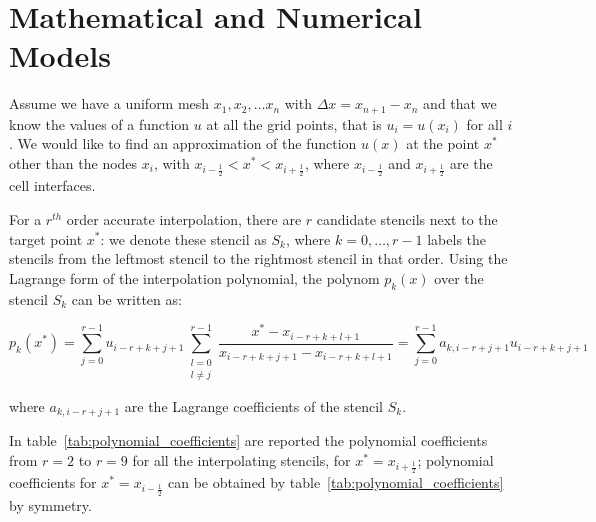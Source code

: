 \section{Mathematical and Numerical Models}\label{sec:MNmodels}

Assume we have a uniform mesh $x_1, x_2, \dots x_n$ with $\Delta x = x_{n+1} - x_n$ and that we know the values of a function $u$ at all the grid points, that is $u_i = u(x_i)$ for all $i$. We would like to find an approximation of the function $u(x)$ at the point $x^*$ other than the nodes $x_i$, with $x_{i-\frac{1}{2}} < x^* < x_{i+\frac{1}{2}}$, where $x_{i-\frac{1}{2}}$ and $x_{i+\frac{1}{2}}$ are the cell interfaces.

For a $r^{th}$ order accurate interpolation, there are $r$ candidate stencils next to the target point $x^*$: we denote these stencil as $S_k$, where $k=0, \dots, r-1$ labels the stencils from the leftmost stencil to the rightmost stencil in that order. Using  the Lagrange form of the interpolation polynomial, the polynom $p_k(x)$ over the stencil $S_k$ can be written as:

\begin{equation}
  \label{eq:Lagrange}
  p_k(x^*) = \sum_{j=0}^{r-1} u_{i-r+k+j+1} \sum_{\substack{l=0 \\ l \neq j}}^{r-1} \frac{x^* - x_{i-r+k+l+1}}{x_{i-r+k+j+1} - x_{i-r+k+l+1}} = \sum_{j=0}^{r-1} a_{k,i-r+j+1} u_{i-r+k+j+1}
\end{equation}

where $a_{k,i-r+j+1}$ are the Lagrange coefficients of the stencil $S_k$.

In table~\ref{tab:polynomial_coefficients} are reported the polynomial coefficients from $r=2$ to $r=9$ for all the interpolating stencils, for $x^* = x_{i+\frac{1}{2}}$; polynomial coefficients for $x^*=x_{i-\frac{1}{2}}$ can be obtained by table~\ref{tab:polynomial_coefficients} by symmetry.

